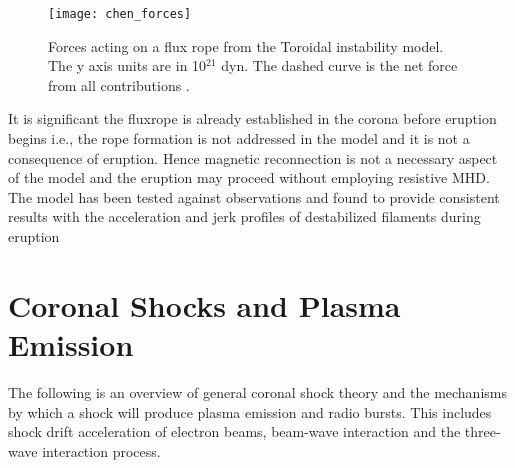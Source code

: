 \begin{figure}[!t]
\begin{center}
\texttt{[image: chen\_forces]}
\caption[The toroidal instability forces]{Forces acting on a flux rope from the Toroidal instability model. The y axis units are in 10$^{21}$ dyn. The dashed curve is the net force from all contributions \citep{chen1989}.}
\label{fig:chen_forces}
\end{center}
\end{figure}

It is significant the fluxrope is already established in the corona before eruption begins i.e., the rope formation is not addressed in the model and it is not a consequence of eruption. Hence magnetic reconnection is not a necessary aspect of the model and the eruption may proceed without employing resistive MHD. The model has been tested against observations and found to provide consistent results with the acceleration and jerk profiles of destabilized filaments during eruption \citep{schrijver2008}

\section{Coronal Shocks and Plasma Emission}\label{sec:3}

The following is an overview of general coronal shock theory and the mechanisms by which a shock will produce plasma emission and radio bursts. This includes shock drift acceleration of electron beams, beam-wave interaction and the three-wave interaction process. 

